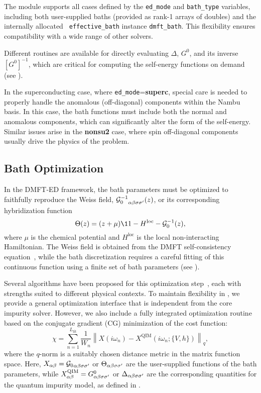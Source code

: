 \documentclass[edipack2.tex]{subfiles}
\begin{document}
The module supports all cases defined by the {\tt ed\_mode} and 
{\tt bath\_type} variables, including both user-supplied baths (provided 
as rank-1 arrays of doubles) and the internally allocated {\tt 
effective\_bath} instance {\tt dmft\_bath}. This flexibility ensures 
compatibility with a wide range of other solvers.

Different routines are available for directly evaluating $\Delta$, 
$G^0$, and its inverse $[G^0]^{-1}$, which are critical for computing 
the self-energy functions on demand (see ). 

In the superconducting case, where {\tt ed\_mode}={\bf superc}, 
special care is needed to properly handle the anomalous (off-diagonal) 
components within the Nambu basis. In this case, the bath functions 
must include both the normal and anomalous components, 
which can significantly alter the form of the self-energy. Similar issues arise in the {\bf nonsu2} case, where spin off-diagonal components usually drive the physics of the problem.




\subsection{Bath Optimization}\label{sSecFit}
In the DMFT-ED framework, the bath parameters must be optimized to 
faithfully reproduce the Weiss field, 
${{\cal G}^{-1}_{0}}_{\alpha\beta\sigma\sigma'}(z)$, or its corresponding hybridization 
function 
\begin{equation}
\Theta(z) = (z + \mu)\11 - H^\mathrm{loc} - \GG_0^{-1}(z),
\end{equation}
where $\mu$ is the chemical potential and $H^\mathrm{loc}$ is the 
local non-interacting Hamiltonian. The Weiss field is obtained from the DMFT 
self-consistency equation~\cite{Georges1996RMP}, while the bath 
discretization requires a careful fitting of this continuous function 
using a finite set of bath parameters (see ).

Several algorithms have been proposed for this optimization 
step~\cite{Garcia2004PRL,Taranto2012PRB,Mejuto_Bath_ASCI-DMFT}, each with strengths suited 
to different physical contexts. To maintain flexibility in \NAME, 
we provide a general optimization interface that is independent 
from the core impurity solver. However, we also include a fully 
integrated optimization routine based on the conjugate gradient (CG) 
minimization of the cost function:
\begin{equation}
\chi = \sum_{n=1}^{L_\mathrm{fit}} 
\frac{1}{W_n} \left\|X(i\omega_n) - 
X^\mathrm{QIM}(i\omega_n; \{V, h\}) \right\|_q,
\label{eq:chiq}
\end{equation}
where the $q$-norm is a suitably chosen distance metric in the 
matrix function space. Here, $X_{\alpha\beta} = {{\cal G}_{0}}_{\alpha\beta\sigma\sigma'}$ or 
$\Theta_{\alpha\beta\sigma\sigma'}$ are the user-supplied functions of the bath parameters, while 
$X_{\alpha\beta}^\mathrm{QIM} = G^0_{\alpha\beta\sigma\sigma'}$ or 
$\Delta_{\alpha\beta\sigma\sigma'}$ are the corresponding quantities for the quantum 
impurity model, as defined in .
\end{document}
